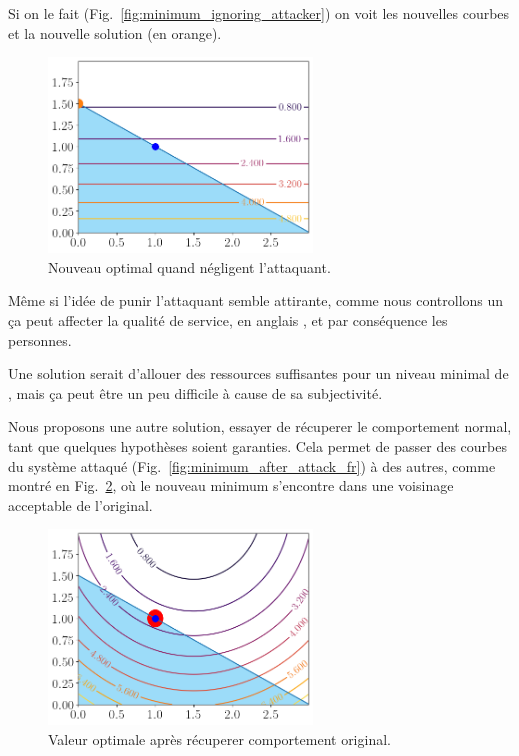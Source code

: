 \documentclass[../main.tex]{subfiles}
\begin{document}
Si on le fait (Fig.~\ref{fig:minimum_ignoring_attacker}) on voit les nouvelles courbes et la nouvelle solution (en orange).
\begin{figure}[h]
  \centering
  \includegraphics[width=7cm]{../img/resilient_eq/ignoreX.png}
  \caption{Nouveau optimal quand négligent l'attaquant.}\label{fig:minimum_ignoring_attacker_fr}
\end{figure}

Même si l'idée de punir l'attaquant semble attirante, comme nous controllons un \cps{} ça peut affecter la qualité de service, en anglais \QoS{}, et par conséquence les personnes.

Une solution serait d'allouer des ressources suffisantes pour un niveau minimal de \QoS{}, mais ça peut être un peu difficile à cause de sa subjectivité.

Nous proposons une autre solution, essayer de récuperer le comportement normal, tant que quelques hypothèses soient garanties.
Cela permet de passer des courbes du système attaqué (Fig.~\ref{fig:minimum_after_attack_fr}) à des autres, comme montré en Fig.~\ref{fig:minimum_recovered_fr}, où le nouveau minimum s'encontre dans une voisinage acceptable de l'original.

\begin{figure}[h]
  \centering
  \includegraphics[width=7cm]{../img/resilient_eq/correctX.png}
  \caption{Valeur optimale après récuperer comportement original.}\label{fig:minimum_recovered_fr}
\end{figure}
\end{document}
